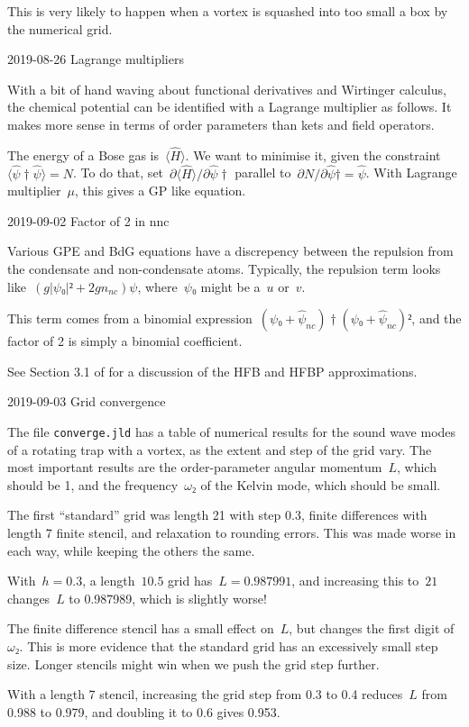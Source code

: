 This is very likely to happen when a vortex is squashed into too small a box by the numerical grid.

2019-08-26 Lagrange multipliers

With a bit of hand waving about functional derivatives and Wirtinger calculus, the chemical potential can be identified with a Lagrange multiplier as follows.  It makes more sense in terms of order parameters than kets and field operators.

The energy of a Bose gas is~$〈\hat H〉$.  We want to minimise it, given the constraint~$〈{\hat ψ}†\hat ψ〉=N$.  To do that, set~$∂〈\hat H〉/∂{\hat ψ}†$ parallel to~$∂N/∂{\hat ψ}†=\hat ψ$.  With Lagrange multiplier~$μ$, this gives a GP like equation.

2019-09-02 Factor of 2 in nnc

Various GPE and BdG equations have a discrepency between the repulsion from the condensate and non-condensate atoms.  Typically, the repulsion term looks like~$(g|ψ₀|²+2gn_{nc})ψ$, where~$ψ₀$ might be a~$u$ or~$v$.

This term comes from a binomial expression~$(ψ₀+\hat ψ_{nc})†(ψ₀+\hat ψ_{nc})²$, and the factor of 2 is simply a binomial coefficient.

See Section 3.1 of \cite{2009-Griffin-Bose} for a discussion of the HFB and HFBP approximations.

2019-09-03 Grid convergence

The file {\tt converge.jld} has a table of numerical results for the sound wave modes of a rotating trap with a vortex, as the extent and step of the grid vary.  The most important results are the order-parameter angular momentum~$L$, which should be 1, and the frequency~$ω₂$ of the Kelvin mode, which should be small.

The first “standard” grid was length 21 with step 0.3, finite differences with length 7 finite stencil, and relaxation to rounding errors.  This was made worse in each way, while keeping the others the same.

With~$h=0.3$, a length~$10.5$ grid has~$L= 0.987991$, and increasing this to~$21$ changes~$L$ to 0.987989, which is slightly worse!

The finite difference stencil has a small effect on~$L$, but changes the first digit of~$ω₂$.  This is more evidence that the standard grid has an excessively small step size.  Longer stencils might win when we push the grid step further.

With a length 7 stencil, increasing the grid step from 0.3 to 0.4 reduces~$L$ from 0.988 to 0.979, and doubling it to 0.6 gives 0.953.  

